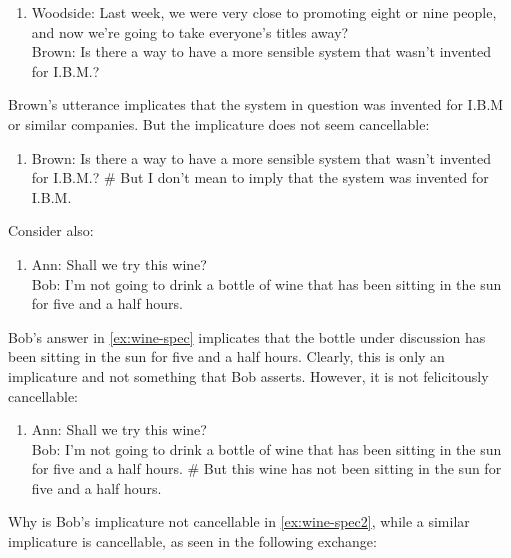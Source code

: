 \documentclass[12pt]{article}
\begin{document}
\begin{enumerate}[resume]
  \item\label{ex:ibm}
    Woodside: Last week, we were very close to promoting eight or nine people, and now we’re going to take everyone's titles away?\\
    Brown: Is there a way to have a more sensible system that wasn't invented for I.B.M.?
\end{enumerate}

Brown's utterance implicates that the system in question was invented for I.B.M or similar companies. But the implicature does not seem cancellable:

\begin{enumerate}[resume]
  \item\label{ex:ibm2}
    Brown: Is there a way to have a more sensible system that wasn't invented for I.B.M.? \# But I don't mean to imply that the system was invented for I.B.M.
\end{enumerate}

Consider also:

\begin{enumerate}[resume]
  \item\label{ex:wine-spec}
    Ann: Shall we try this wine?\\
    Bob: I'm not going to drink a bottle of wine that has been sitting in the sun for five and a half hours.
\end{enumerate}
%
Bob's answer in \ref{ex:wine-spec} implicates that the bottle under discussion has been sitting in the sun for five and a half hours. Clearly, this is only an implicature and not something that Bob asserts. However, it is not felicitously cancellable:

\begin{enumerate}[resume]
  \item\label{ex:wine-spec2}
    Ann: Shall we try this wine?\\
    Bob: I'm not going to drink a bottle of wine that has been sitting in the sun for five and a half hours. \# But this wine has not been sitting in the sun for five and a half hours.
\end{enumerate}
%
Why is Bob's implicature not cancellable in \ref{ex:wine-spec2}, while a similar implicature is cancellable, as seen in the following exchange:
\end{document}
